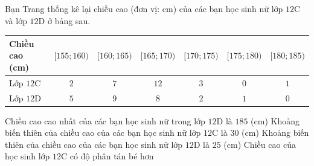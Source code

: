 \begin{ex}%

	Bạn Trang thống kê lại chiều cao (đơn vị: cm) của các bạn học sinh nữ lớp $12\mathrm{C}$ và lớp $12\mathrm{D}$ ở bảng sau.
	\begin{center}
		\begin{tabular}{|l|c|c|c|c|c|c|}
			\hline
			Chiều cao (cm) & $[155;160)$ & $[160;165)$ & $[165;170)$ & $[170;175)$ & $[175;180)$ & $[180;185)$\\ \hline
			Lớp $12\mathrm{C}$ & $2$ & $7$ & $12$ & $3$ & $0$ & $1$\\ \hline
			Lớp $12\mathrm{D}$ & $5$ & $9$ & $8$ & $2$ & $1$ & $0$\\
			\hline
		\end{tabular}
	\end{center}
	\choiceTF
	{Chiều cao cao nhất của các bạn học sinh nữ trong lớp $12\mathrm{D}$ là $185$ (cm)}
	{\True Khoảng biến thiên của chiều cao của các bạn học sinh nữ lớp $12\mathrm{C}$ là $30$ (cm)}
	{\True Khoảng biến thiên của chiều cao của các bạn học sinh nữ lớp $12\mathrm{D}$ là $25$ (cm)}
	{Chiều cao của học sinh lớp $12\mathrm{C}$ có độ phân tán bé hơn}
\end{ex}

